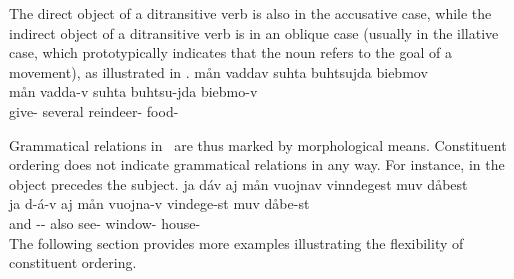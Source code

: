 The direct object of a ditransitive verb is also in the accusative case, while the indirect object %
of a ditransitive verb is in an oblique case (usually in the illative case, which prototypically indicates that the noun refers to the goal of a movement), as illustrated in .%
\ea\label{ditrans1}
\glll	mån vaddav suhta buhtsujda biebmov\\
	mån vadda-v suhta buhtsu-jda biebmo-v\\
	 give- several reindeer- food-\\\nopagebreak
{} 
\z

Grammatical relations in \PS\ are thus marked by morphological means. Constituent ordering does not indicate grammatical relations in any way. For instance, in  the object precedes the subject. %
\ea\label{monotrans2}
\glll	ja dáv aj mån vuojnav vinndegest muv dåbest\\
	ja d-á-v aj mån vuojna-v vindege-st muv dåbe-st\\
	and -- also  see- window-  house-\\\nopagebreak
{} 
\z
The following section %
provides more examples illustrating the flexibility of constituent ordering.

